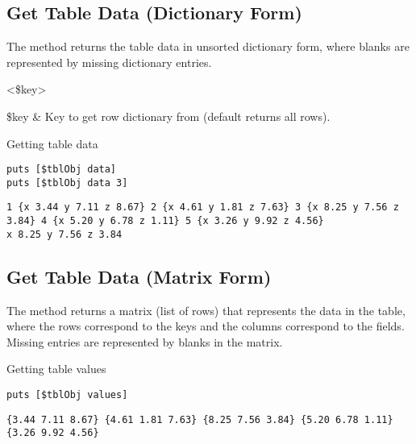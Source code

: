 \subsection{Get Table Data (Dictionary Form)}
The method  returns the table data in unsorted dictionary form, where blanks are represented by missing dictionary entries. 
\begin{syntax}
 <\$key>
\end{syntax}
\begin{args}
\$key & Key to get row dictionary from (default returns all rows).
\end{args}

\begin{example}{Getting table data}
\begin{lstlisting}
puts [$tblObj data]
puts [$tblObj data 3]
\end{lstlisting}
\tcblower
\begin{lstlisting}
1 {x 3.44 y 7.11 z 8.67} 2 {x 4.61 y 1.81 z 7.63} 3 {x 8.25 y 7.56 z 3.84} 4 {x 5.20 y 6.78 z 1.11} 5 {x 3.26 y 9.92 z 4.56}
x 8.25 y 7.56 z 3.84
\end{lstlisting}
\end{example}
\subsection{Get Table Data (Matrix Form)}
The method  returns a matrix (list of rows) that represents the data in the table, where the rows correspond to the keys and the columns correspond to the fields. Missing entries are represented by blanks in the matrix. 
\begin{syntax}
\end{syntax}
\begin{example}{Getting table values}
\begin{lstlisting}
puts [$tblObj values]
\end{lstlisting}
\tcblower
\begin{lstlisting}
{3.44 7.11 8.67} {4.61 1.81 7.63} {8.25 7.56 3.84} {5.20 6.78 1.11} {3.26 9.92 4.56}
\end{lstlisting}
\end{example}
\clearpage

